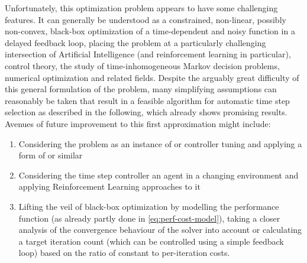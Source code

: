 \documentclass[oneside, a4paper]{book}
\begin{document}
    Unfortunately, this optimization problem appears to have some challenging features. It can generally be understood as a constrained, non-linear, possibly non-convex, black-box optimization of a time-dependent and noisy function in a delayed feedback loop, placing the problem at a particularly challenging intersection of Artificial Intelligence (and reinforcement learning in particular), control theory, the study of time-inhomogeneous Markov decision problems, numerical optimization and related fields. Despite the arguably great difficulty of this general formulation of the problem, many simplifying assumptions can reasonably be taken that result in a feasible algorithm for automatic time step selection as described in the following, which already shows promising results. Avenues of future improvement to this first approximation might include:
    \begin{enumerate}
      \item Considering the problem as an instance of \autocite[online learning for black box optimization]{bbo-bayesian-phd} or controller tuning and applying a form of \autocite[Time-Varying Bayesian Optimization]{time-varying-bo} or similar \autocite[time-varying optimization]{tvopt-library}
      \item Considering the time step controller an agent in a changing environment and applying Reinforcement Learning approaches to it 
      \item Lifting the veil of black-box optimization by modelling the performance function (as already partly done in \autoref{eq:perf-cost-model}), taking a closer analysis of the convergence behaviour of the solver into account or calculating a target iteration count (which can be controlled using a simple feedback loop) based on the ratio of constant to per-iteration costs.
    \end{enumerate} 
\end{document}
